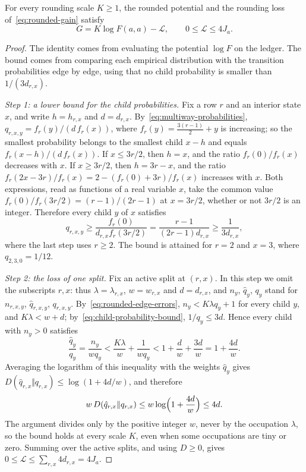 \begin{proposition}\label{prop:entropy-loss}
For every rounding scale \(K\ge1\), the rounded potential and the rounding
loss of~\eqref{eq:rounded-gain} satisfy
\begin{equation}\label{eq:rounded-entropy}
 G=K\log F(a,a)-\mathcal L,
 \qquad 0\le\mathcal L\le4J_a.
\end{equation}
\end{proposition}

\begin{proof}
The identity comes from evaluating the potential \(\log F\) on the ledger.
The bound comes from comparing each empirical distribution with the
transition probabilities edge by edge, using that no child probability is
smaller than \(1/(3d_{r,x})\).

\emph{Step 1: a lower bound for the child probabilities.} Fix a row \(r\)
and an interior state \(x\), and write \(h=h_{r,x}\) and \(d=d_{r,x}\).
By~\eqref{eq:multiway-probabilities},
\(q_{r,x,y}=f_r(y)/(d\,f_r(x))\), where \(f_r(y)=\frac{3(r-1)}2+y\) is
increasing; so the smallest probability belongs to the smallest child
\(x-h\) and equals \(f_r(x-h)/(d\,f_r(x))\). If \(x\le3r/2\), then \(h=x\),
and the ratio \(f_r(0)/f_r(x)\) decreases with \(x\). If \(x\ge3r/2\), then
\(h=3r-x\), and the ratio
\(f_r(2x-3r)/f_r(x)=2-(f_r(0)+3r)/f_r(x)\) increases with \(x\). Both
expressions, read as functions of a real variable \(x\), take the common
value \(f_r(0)/f_r(3r/2)=(r-1)/(2r-1)\) at \(x=3r/2\), whether or not \(3r/2\)
is an integer. Therefore every child \(y\) of \(x\) satisfies
\begin{equation}\label{eq:child-probability-bound}
 q_{r,x,y}\ge\frac{f_r(0)}{d_{r,x}f_r(3r/2)}
 =\frac{r-1}{(2r-1)d_{r,x}}\ge\frac1{3d_{r,x}},
\end{equation}
where the last step uses \(r\ge2\). The bound is attained for \(r=2\) and
\(x=3\), where \(q_{2,3,0}=1/12\).

\emph{Step 2: the loss of one split.} Fix an active split at \((r,x)\). In
this step we omit the subscripts \(r,x\): thus \(\lambda=\lambda_{r,x}\),
\(w=w_{r,x}\) and \(d=d_{r,x}\), and \(n_y\), \(\hat q_y\), \(q_y\) stand
for \(n_{r,x,y}\), \(\hat q_{r,x,y}\), \(q_{r,x,y}\).
By~\eqref{eq:rounded-edge-errors}, \(n_y<K\lambda q_y+1\) for every child
\(y\), and \(K\lambda<w+d\); by~\eqref{eq:child-probability-bound},
\(1/q_y\le3d\). Hence every child with \(n_y>0\) satisfies
\[
 \frac{\hat q_y}{q_y}=\frac{n_y}{wq_y}
 <\frac{K\lambda}{w}+\frac1{wq_y}
 <1+\frac dw+\frac{3d}w=1+\frac{4d}w.
\]
Averaging the logarithm of this inequality with the weights \(\hat q_y\)
gives \(D(\hat q_{r,x}\Vert q_{r,x})\le\log(1+4d/w)\), and therefore
\[
 w\,D(\hat q_{r,x}\Vert q_{r,x})\le w\log\Bigl(1+\frac{4d}w\Bigr)\le4d.
\]
The argument divides only by the positive integer \(w\), never by the
occupation \(\lambda\), so the bound holds at every scale \(K\), even when
some occupations are tiny or zero. Summing over the active splits, and
using \(D\ge0\), gives \(0\le\mathcal L\le\sum_{r,x}4d_{r,x}=4J_a\).


\end{proof}
